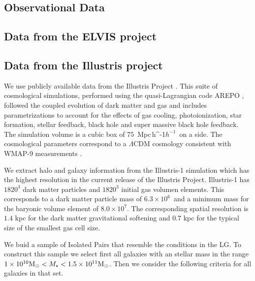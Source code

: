 \documentclass[a4paper,fleqn,usenatbib]{mnras}
\newcommand{\Mpch}{\,{\rm Mpc}\,\ifmmode h^{-1}\else $h^{-1}$\fi}
\newcommand{\Msun}{{\ifmmode{{\rm{M_{\odot}}}}\else{${\rm{M_{\odot}}}$}\fi}}
\begin{document}
\label{Data Samples}

\subsection{Observational Data}
\label{sec:obs}



\subsection{Data from the ELVIS project}
\label{sim:ELVIS}

\subsection{Data from the Illustris project}
\label{sec:illustris}

We use publicly available data from the Illustris Project 
\citep{2014MNRAS.444.1518V}. 
This suite of cosmological simulations, performed using the quasi-Lagrangian
code AREPO \citep{2010MNRAS.401..791S}, followed the coupled evolution of dark 
matter and gas and includes parametrizations to account for the effects of
gas cooling, photoionization, star formation, stellar feedback, black
hole and super massive black hole feedback. 
The simulation volume is a cubic box of $75$ \Mpch\ on a side.
The cosmological parameters correspond to a $\Lambda$CDM cosmology
consistent with WMAP-9 measurements \citep{2013ApJS..208...19H}. 

We extract halo and galaxy information from the Illustris-1 simulation
which has the highest resolution in the current release of the
Illustris Project.
Illustris-1 has $1820^3$ dark matter particles and $1820^3$ initial gas
volumen elements. 
This corresponds to a dark matter particle mass of
$6.3\times 10^6$\Msun\ and a minimum mass for the baryonic volume
element of $8.0\times 10^7$\Msun. 
The corresponding spatial resolution is $1.4$ kpc for the dark matter
gravitational softening and $0.7$ kpc for the typical size of the
smallest gas cell size. 

We buid a sample of Isolated Pairs that resemble the conditions
in the LG.
To construct this sample we select first all galaxies with  an stellar mass in the range $1\times10^{10}\Msun
<M_{\star}<1.5 \times 10^{11} \Msun$.
Then we consider the following criteria for all galaxies in that set.
\end{document}

